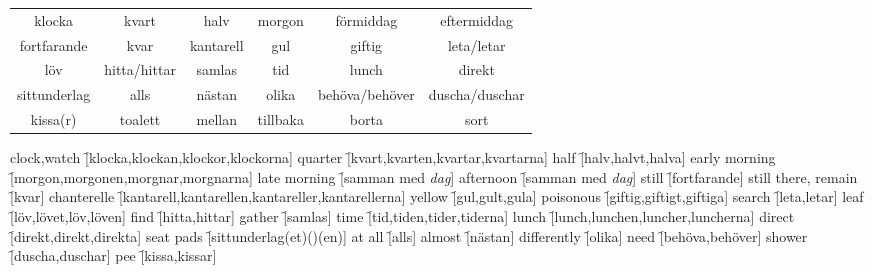 \newpage
\begin{center}
    \begin{tabular}{|c c c c c c|}
        \hline
        klocka & kvart & halv & morgon & förmiddag & eftermiddag \\
        fortfarande & kvar & kantarell & gul & giftig & leta/letar \\
        löv & hitta/hittar & samlas & tid & lunch & direkt \\
        sittunderlag & alls & nästan & olika & behöva/behöver & duscha/duschar \\
        kissa(r) & toalett & mellan & tillbaka & borta & sort \\
        \hline
    \end{tabular}
\end{center}

\begin{questions}
    \begin{multicols}{2}
        \raggedcolumns
        \question clock,watch \f[klocka,klockan,klockor,klockorna]
        \question quarter \f[kvart,kvarten,kvartar,kvartarna]
        \question half \f[halv,halvt,halva]
        \question early morning \f[morgon,morgonen,morgnar,morgnarna]
        \question late morning \f[samman med \textit{dag}]
        \question afternoon \f[samman med \textit{dag}]
        \question still \f[fortfarande]
        \question still there, remain \f[kvar]
        \question chanterelle \f[kantarell,kantarellen,kantareller,kantarellerna]
        \question yellow \f[gul,gult,gula]
        \question poisonous \f[giftig,giftigt,giftiga]
        \question search \f[leta,letar]
        \question leaf \f[löv,lövet,löv,löven]
        \question find \f[hitta,hittar]
        \question gather \f[samlas]
        \question time \f[tid,tiden,tider,tiderna]
        \question lunch \f[lunch,lunchen,luncher,luncherna]
        \question direct \f[direkt,direkt,direkta]
        \question seat pads \f[sittunderlag(et)()(en)]
        \question at all \f[alls]
        \question almost \f[nästan]
        \question differently \f[olika]
        \question need \f[behöva,behöver]
        \question shower \f[duscha,duschar]
        \question pee \f[kissa,kissar]
    \end{multicols}
\end{questions}
